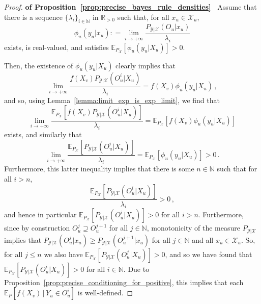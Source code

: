\documentclass[twoside,11pt]{article}
\newcommand{\nats}{\mathbb{N}}
\newcommand{\reals}{\mathbb{R}}
\newcommand{\realspos}{\reals_{>0}}
\newcommand{\states}{\mathcal{X}}
\newcommand{\observs}{\mathcal{Y}}
\newcommand{\coloneqq}{:\!=}
\begin{document}
\begin{proof}{\bf of Proposition~\ref{prop:precise_bayes_rule_densities}~}
Assume that there is a sequence $\{\lambda_i\}_{i\in\nats}$ in $\realspos$ such that, for all $x_u\in\states_u$,
\begin{equation*}
\phi_u(y_u\vert x_u) \coloneqq \lim_{i\to+\infty}\frac{P_{\observs\vert\states}(O_u\vert x_u)}{\lambda_i}
\end{equation*}
exists, is real-valued, and satisfies $\mathbb{E}_{P_\states}[\phi_u(y_u\vert X_u)]>0$. 

Then, the existence of $\phi_u(y_u\vert X_u)$ clearly implies that
\begin{equation*}
\lim_{i\to+\infty} \frac{f(X_v)P_{\observs\vert\states}(O_u^i\vert X_u)}{\lambda_i} = f(X_v)\phi_u(y_u\vert X_u)\,,
\end{equation*}
and so, using Lemma~\ref{lemma:limit_exp_is_exp_limit}, we find that
\begin{equation*}
\lim_{i\to+\infty}\frac{\mathbb{E}_{P_\states}[f(X_v)P_{\observs\vert\states}(O_u^i\vert X_u)]}{\lambda_i} = \mathbb{E}_{P_\states}[f(X_v)\phi_u(y_u\vert X_u)]
\end{equation*}
exists, and similarly that
\begin{equation*}
\lim_{i\to+\infty}\frac{\mathbb{E}_{P_\states}[P_{\observs\vert\states}(O_u^i\vert X_u)]}{\lambda_i} = \mathbb{E}_{P_\states}[\phi_u(y_u\vert X_u)] > 0\,.
\end{equation*}
Furthermore, this latter inequality implies that there is some $n\in\nats$ such that for all $i>n$,
\begin{equation*}
\frac{\mathbb{E}_{P_\states}[P_{\observs\vert\states}(O_u^i\vert X_u)]}{\lambda_i} > 0\,,
\end{equation*}
and hence in particular $\mathbb{E}_{P_\states}[P_{\observs\vert\states}(O_u^i\vert X_u)]>0$ for all $i>n$. Furthermore, since by construction $O_u^j\supseteq O_u^{j+1}$ for all $j\in\nats$, monotonicity of the measure $P_{\observs\vert\states}$ implies that $P_{\observs\vert\states}(O_u^j\vert x_u) \geq P_{\observs\vert\states}(O_u^{j+1}\vert x_u)$ for all $j\in\nats$ and all $x_u\in\states_u$. So, for all $j\leq n$ we also have $\mathbb{E}_{P_\states}[P_{\observs\vert\states}(O_u^j\vert X_u)]>0$, and so we have found that $\mathbb{E}_{P_\states}[P_{\observs\vert\states}(O_u^i\vert X_u)]>0$ for all $i\in\nats$. Due to Proposition~\ref{prop:precise_conditioning_for_positive}, this implies that each $\mathbb{E}_P[f(X_v)\,\vert\,Y_u\in O_u^i]$ is well-defined.


\end{proof}
\end{document}
